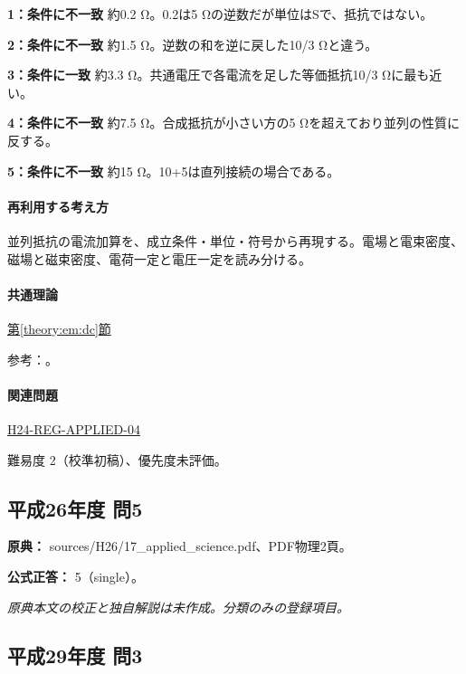 \noindent\textbf{1：条件に不一致} 約0.2 Ω。0.2は5 Ωの逆数だが単位はSで、抵抗ではない。\par

\noindent\textbf{2：条件に不一致} 約1.5 Ω。逆数の和を逆に戻した10/3 Ωと違う。\par

\noindent\textbf{3：条件に一致} 約3.3 Ω。共通電圧で各電流を足した等価抵抗10/3 Ωに最も近い。\par

\noindent\textbf{4：条件に不一致} 約7.5 Ω。合成抵抗が小さい方の5 Ωを超えており並列の性質に反する。\par

\noindent\textbf{5：条件に不一致} 約15 Ω。10+5は直列接続の場合である。\par

\paragraph{再利用する考え方} 並列抵抗の電流加算を、成立条件・単位・符号から再現する。電場と電束密度、磁場と磁束密度、電荷一定と電圧一定を読み分ける。

\paragraph{共通理論} \hyperref[theory:em:dc]{第\ref*{theory:em:dc}節}

\par 参考：\cite{mit_em07}。

\paragraph{関連問題} \hyperref[q:h24-reg-applied-04]{H24-REG-APPLIED-04}

\par 難易度 2（校準初稿）、優先度未評価。

\subsection{平成26年度 問5}
\label{q:h26-reg-applied-05}

\noindent\textbf{原典：} sources/H26/17\_applied\_science.pdf、PDF物理2頁。

\textbf{公式正答：} 5（single）。

\par\textit{原典本文の校正と独自解説は未作成。分類のみの登録項目。}

\subsection{平成29年度 問3}
\label{q:h29-reg-applied-03}

